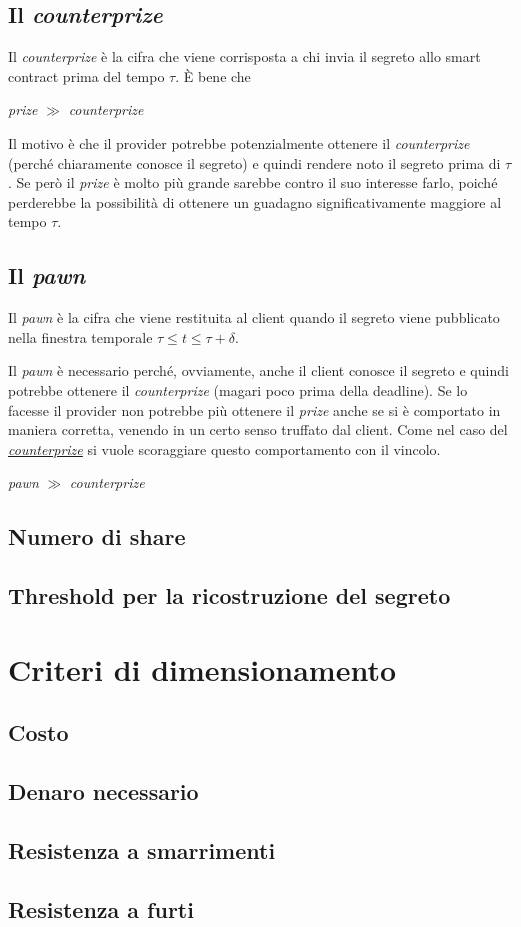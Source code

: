 \subsection{Il \textit{counterprize}}
\label{subsec:counterprize}
Il \textit{counterprize} è la cifra che viene corrisposta a chi invia il segreto
allo smart contract prima del tempo $ \tau $. È bene che
\begin{center}
	\textit{prize} $ \gg $ \textit{counterprize}
\end{center}
Il motivo è che il provider potrebbe potenzialmente ottenere
il \textit{counterprize} (perché chiaramente conosce il segreto) e quindi
rendere noto il segreto prima di $ \tau $. Se però il
\textit{prize} è molto più grande sarebbe contro il suo
interesse farlo,
poiché perderebbe la possibilità di ottenere un guadagno significativamente
maggiore al tempo $ \tau $.

\subsection{Il \textit{pawn}}
Il \textit{pawn} è la cifra che viene restituita al client quando il segreto
viene pubblicato nella finestra temporale $ \tau \leq t \leq \tau + \delta $.

Il \textit{pawn} è necessario perché, ovviamente, anche il client conosce il segreto
e quindi potrebbe ottenere il \textit{counterprize} (magari poco prima della deadline).
Se lo facesse il provider non potrebbe più ottenere il \textit{prize} anche se si è
comportato in maniera corretta, venendo in un certo senso truffato dal client.
Come nel caso del \hyperref[subsec:counterprize]{\textit{counterprize}}
si vuole scoraggiare questo comportamento con il vincolo.
\begin{center}
	\textit{pawn} $ \gg $ \textit{counterprize}
\end{center}

\subsection{Numero di share}

\subsection{Threshold per la ricostruzione del segreto}

\section{Criteri di dimensionamento}
\subsection{Costo}
\subsection{Denaro necessario}
\subsection{Resistenza a smarrimenti}
\subsection{Resistenza a furti}








